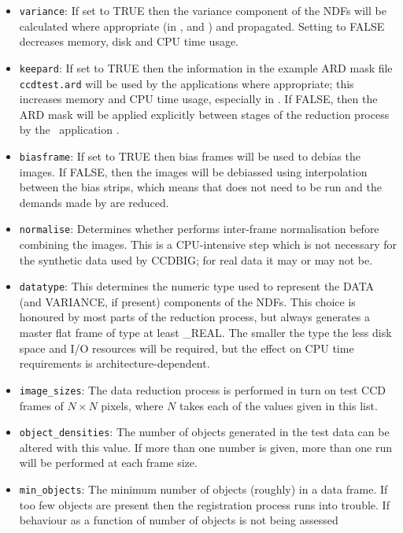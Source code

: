 \begin{itemize}
%
\item {\tt variance}: 
If set to TRUE then the variance component of the NDFs will be  
calculated where appropriate 
(in ,  and ) 
and propagated.
Setting to FALSE decreases memory, disk and CPU time usage.
%
\item {\tt keepard}:
If set to TRUE then the information in the example ARD mask file
{\tt ccdtest.ard} will be used by the 
{\CCDPref} applications where appropriate;
this increases memory and CPU time usage, especially in .
If FALSE, then the ARD mask will be applied explicitly 
between stages of the reduction process 
by the \KAPPAref\ application .
%
\item {\tt biasframe}:
If set to TRUE then bias frames will be used to debias the images. 
If FALSE, then the images will be debiassed using interpolation
between the bias strips, which means that 
does not need to be run and the demands made by 
are reduced.
%
\item {\tt normalise}:
Determines whether  performs 
inter-frame normalisation before combining the images.
This is a CPU-intensive step which
is not necessary for the synthetic data used by CCDBIG;
for real data it may or may not be.
%
\item {\tt datatype}:
This determines the numeric type used to represent the
DATA (and VARIANCE, if present) components of the NDFs.
This choice is honoured by most parts of the reduction 
process, but  always generates a 
master flat frame of type at least \_REAL.
The smaller the type the less disk space and I/O resources
will be required, but the effect on CPU time requirements
is architecture-dependent.
%
\item {\tt image\_sizes}:
The data reduction process is performed in turn on 
test CCD frames of $N \times N$ pixels, where $N$ takes each
of the values given in this list.
%
\item {\tt object\_densities}:
The number of objects generated in the test data can be altered
with this value.  If more than one number is given,  more than one
run will be performed at each frame size.
%
\item {\tt min\_objects}:
The minimum number of objects (roughly) in a data frame.
If too few objects are present then the registration process
runs into trouble.
If behaviour as a function of number of objects is not being assessed 

\end{itemize}
